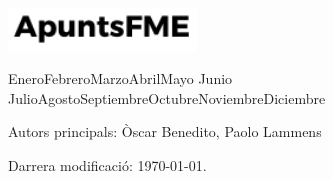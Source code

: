 \begin{titlepage}
	
	\vspace{2\baselineskip} %
	
	
	\vfill %
	
	
	\includegraphics[width=5cm]{../logo.pdf}
	
	\vspace{0.3\baselineskip} %
	
	
	{\ifcase \month \or Enero\or Febrero\or Marzo\or Abril\or Mayo \or Junio\or 
	Julio\or Agosto\or Septiembre\or Octubre\or Noviembre\or Diciembre\fi \:  
	\number \year} \let\Date\@date
	
	
	
\end{titlepage}

\vspace*{\fill}

\noindent Autors principals: Òscar Benedito, Paolo Lammens

\quad

\noindent %

\quad

\noindent %

\quad

\noindent Darrera modificació: \today.

\doclicenseThis